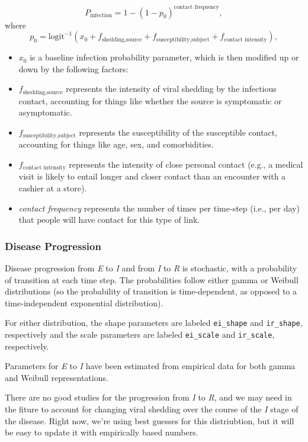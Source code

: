 \documentclass[
]{article}
\providecommand{\tightlist}{%
  \setlength{\itemsep}{0pt}\setlength{\parskip}{0pt}}
\begin{document}
\[P_{\text{infection}} = 1 - (1 - p_0)^{\text{contact frequency}},\]
where \[
p_0 = \text{logit}^{-1}\left( x_0 + f_{\text{shedding}, \text{source}} + 
  f_{\text{susceptibility}, \text{subject}} + f_{\text{contact intensity}} \right),
\]

\begin{itemize}
\tightlist
\item
  \(x_0\) is a baseline infection probability parameter, which is then
  modified up or down by the following factors:
\item
  \(f_{\text{shedding}, \text{source}}\) represents the intensity of
  viral shedding by the infectious contact, accounting for things like
  whether the source is symptomatic or asymptomatic.
\item
  \(f_{\text{susceptibility}, \text{subject}}\) represents the
  susceptibility of the susceptible contact, accounting for things like
  age, sex, and comorbidities.
\item
  \(f_{\text{contact intensity}}\) represents the intensity of close
  personal contact (e.g., a medical visit is likely to entail longer and
  closer contact than an encounter with a cashier at a store).
\item
  \emph{contact frequency} represents the number of times per time-step
  (i.e., per day) that people will have contact for this type of link.
\end{itemize}

\hypertarget{disease-progression}{%
\subsubsection{Disease Progression}\label{disease-progression}}

Disease progression from \emph{E} to \emph{I} and from \emph{I} to
\emph{R} is stochastic, with a probability of transition at each time
step. The probabilities follow either gamma or Weibull distributions (so
the probability of transition is time-dependent, as opposed to a
time-independent exponential distribution).

For either distribution, the shape parameters are labeled
\texttt{ei\_shape} and \texttt{ir\_shape}, respectively and the scale
parameters are labeled \texttt{ei\_scale} and \texttt{ir\_scale},
respectively.

Parameters for \emph{E} to \emph{I} have been estimated from empirical
data for both gamma and Weibull representations.

There are no good studies for the progression from \emph{I} to \emph{R},
and we may need in the fiture to account for changing viral shedding
over the course of the \emph{I} stage of the disease. Right now, we're
using best guesses for this distriubtion, but it will be easy to update
it with empirically based numbers.
\end{document}
